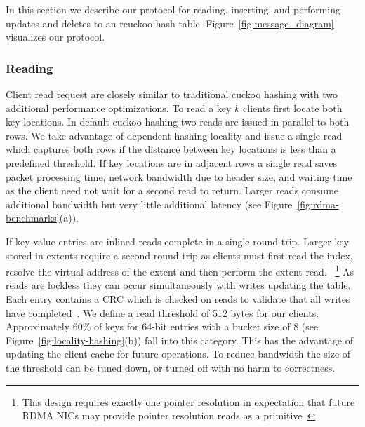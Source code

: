In this section we describe our protocol for reading,
inserting, and performing updates and deletes to an rcuckoo
hash table. Figure~\ref{fig:message_diagram} visualizes our
protocol.

\subsubsection{Reading} 
\label{sec:reading}

Client read request are closely similar to traditional
cuckoo hashing with two additional performance
optimizations. To read a key $k$ clients first locate both
key locations. In default cuckoo hashing two reads are
issued in parallel to both rows. We take advantage of
dependent hashing locality and issue a single read which
captures both rows if the distance between key locations is
less than a predefined threshold. If key locations are in
adjacent rows a single read saves packet processing time,
network bandwidth due to header size, and waiting time as
the client need not wait for a second read to return. Larger
reads consume additional bandwidth but very little
additional latency (see Figure~\ref{fig:rdma-benchmarks}(a)).

If key-value entries are inlined reads complete in a single
round trip. Larger key stored in extents require a second
round trip as clients must first read the index, resolve the
virtual address of the extent and then perform the extent
read.
~\footnote{This design requires exactly one pointer
resolution in expectation that future RDMA NICs may provide
pointer resolution reads as a primitive~\cite{prism}}
As reads are lockless they can occur simultaneously with
writes updating the table. Each entry contains a CRC which
is checked on reads to validate that all writes have
completed~\cite{pilaf,cell}.
We define a read threshold of 512 bytes for our clients.
Approximately 60\% of keys for 64-bit entries with a bucket
size of 8 (see Figure~\ref{fig:locality-hashing}(b)) fall
into this category. This has the advantage of updating the
client cache for future operations.
To reduce bandwidth the size of the threshold can be tuned
down, or turned off with no harm to correctness.




